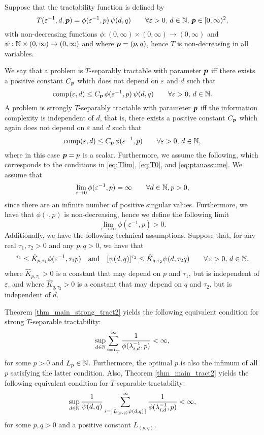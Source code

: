 \documentclass[sort&compress]{elsarticle}
\begin{document}
\begin{example}
Suppose that the tractability function is defined by
\[
 T(\varepsilon^{-1},d,\boldsymbol{p})= \phi(\varepsilon^{-1},p)\, \psi(d,q)
 \qquad \forall \varepsilon > 0, \,  d \in \mathbb{N}, \, \boldsymbol{p} \in [0,\infty)^2,
\]
with non-decreasing functions $\phi : (0,\infty) \times (0,\infty) \to (0,\infty)$ and $\psi : \mathbb{N}  \times (0,\infty) \to (0,\infty)$ and where $\boldsymbol{p} = (p,q)$, hence $T$ is non-decreasing in all variables.

We say that a problem is $T$-separably tractable with parameter $\boldsymbol{p}$ iff there exists a positive constant $C_{\boldsymbol{p}}$ which does not depend on $\varepsilon$ and $d$ such that
\[
\operatorname{comp}(\varepsilon,d) \leq  C_{\boldsymbol{p}} \,  \phi(\varepsilon^{-1},p)\, \psi(d,q)\qquad \forall \varepsilon >0, \, d\in\mathbb{N}.
\]
A problem is strongly $T$-separably tractable with parameter $\boldsymbol{p}$ iff the information complexity is independent of $d$, that is, there exists a positive constant $C_{\boldsymbol{p}}$ which again does not depend on $\varepsilon$ and $d$ such that
\[
\operatorname{comp}(\varepsilon,d) \leq C_{\boldsymbol{p}}\,\phi(\varepsilon^{-1},p)\qquad \forall \varepsilon >0, \, d\in\mathbb{N},
\] where in this case $\boldsymbol{p} = p$ is a scalar.
Furthermore, we assume the following, which corresponds to the conditions in \eqref{eq:Tlim}, \eqref{eq:T0}, and \eqref{eq:ptauassume}. We assume that
\[
\lim_{\varepsilon\rightarrow0}\phi(\varepsilon^{-1},p) = \infty \qquad \forall d\in\mathbb{N}, p >0,
\]
since there are an infinite number of positive singular values. Furthermore, we have that $\phi(\cdot,p)$ is non-decreasing, hence we define the following limit
\[
\lim_{\varepsilon \rightarrow \infty}\phi(\varepsilon^{-1},p) >0.
\]
Additionally, we have the following technical assumptions. Suppose that, for any real $\tau_1, \tau_2>0$ and any $p,q>0$, we have that
\begin{align*}
     [\phi(\varepsilon^{-1},p)]^{\tau_1} \le \hat{K}_{p,\tau_1} \phi (\varepsilon^{-1},\tau_1 p)
     \quad \mbox{and} \quad
      [\psi(d,q)]^{\tau_2} \le \hat{K}_{q,\tau_2} \psi (d,\tau_2 q) \qquad \forall \, \varepsilon >0,\, d\in \naturals,
\end{align*} where $\hat{K}_{p,\tau_1}>0$ is a constant that may depend on $p$ and $\tau_1$, but is independent of $\varepsilon$, and where $\hat{K}_{q,\tau_2}>0$ is a constant that may depend on $q$ and $\tau_2$, but is independent of $d$.

Theorem \ref{thm_main_strong_tract2} yields the following equivalent condition for strong $T$-separable tractability:
\begin{equation*} \label{eq:strong_tractiff}
     \sup_{d \in \mathbb{N}} \sum_{i = L_p}^\infty \frac{1}{\phi(\lambda_{i, d}^{-1},p)} < \infty,
\end{equation*}
for some $p>0$ and $L_p \in \mathbb{N}$. Furthermore, the optimal $p$ is also the infimum of all $p$ satisfying the latter condition. Also,
Theorem \ref{thm_main_tract2} yields the following equivalent condition for $T$-separable tractability:
\[
 \sup_{d \in \mathbb{N}} \frac{1}{\psi(d,q)} \sum_{i = \lceil L_{(p,q)}\psi(d,q)\rceil}^\infty \frac{1}{\phi(\lambda_{i, d}^{-1},p)} < \infty,
\] for some $p,q >0$ and a positive constant $L_{(p,q)}$.
\end{example}
\end{document}
